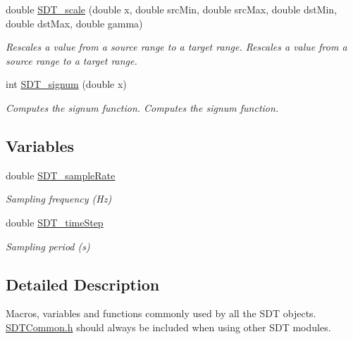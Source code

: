 \begin{DoxyCompactItemize}
double \hyperlink{group__common_gaefd9c7447cc1aef51100da1e409755a0}{S\+D\+T\+\_\+scale} (double x, double src\+Min, double src\+Max, double dst\+Min, double dst\+Max, double gamma)
\begin{DoxyCompactList}\small\item\em Rescales a value from a source range to a target range. Rescales a value from a source range to a target range. \end{DoxyCompactList}\item 
int \hyperlink{group__common_gaa68a3bc9231e89b2d15a78fb6675c825}{S\+D\+T\+\_\+signum} (double x)
\begin{DoxyCompactList}\small\item\em Computes the signum function. Computes the signum function. \end{DoxyCompactList}\end{DoxyCompactItemize}
\subsection*{Variables}
\begin{DoxyCompactItemize}
\item 
\hypertarget{group__common_gaca85f7f7a23f7930d5347a07a29ec083}{}double \hyperlink{group__common_gaca85f7f7a23f7930d5347a07a29ec083}{S\+D\+T\+\_\+sample\+Rate}\label{group__common_gaca85f7f7a23f7930d5347a07a29ec083}

\begin{DoxyCompactList}\small\item\em Sampling frequency (Hz) \end{DoxyCompactList}\item 
\hypertarget{group__common_ga460d5a070e1e8b57b0aebb5a4911458c}{}double \hyperlink{group__common_ga460d5a070e1e8b57b0aebb5a4911458c}{S\+D\+T\+\_\+time\+Step}\label{group__common_ga460d5a070e1e8b57b0aebb5a4911458c}

\begin{DoxyCompactList}\small\item\em Sampling period (s) \end{DoxyCompactList}\end{DoxyCompactItemize}


\subsection{Detailed Description}
Macros, variables and functions commonly used by all the S\+D\+T objects. \hyperlink{_s_d_t_common_8h}{S\+D\+T\+Common.\+h} should always be included when using other S\+D\+T modules. 

